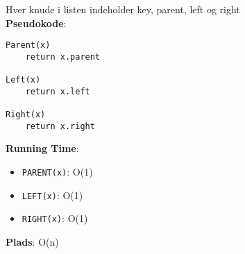 Hver knude i listen indeholder key, parent, left og right\\
\textbf{Pseudokode}:
\begin{lstlisting}[frame=single, mathescape=true]
Parent(x)
	return x.parent

Left(x)
	return x.left

Right(x)
	return x.right
\end{lstlisting}
\textbf{Running Time}:
\begin{itemize}
	\item \texttt{PARENT(x)}: O(1)
	\item \texttt{LEFT(x)}: O(1)
	\item \texttt{RIGHT(x)}: O(1)
\end{itemize}
\textbf{Plads}: O(n)